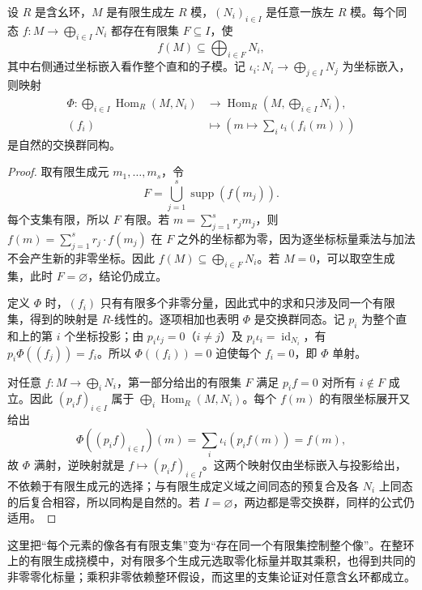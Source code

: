 \begin{proposition}\label{b2:prop:finite-hom-direct-sum}
	设 \(R\) 是含幺环，\(M\) 是有限生成左 \(R\) 模，\((N_i)_{i\in I}\) 是任意一族左 \(R\) 模。每个同态 \(f:M\to\bigoplus_{i\in I}N_i\) 都存在有限集 \(F\subseteq I\)，使
	\[
		f(M)\subseteq\bigoplus_{i\in F}N_i,
	\]
	其中右侧通过坐标嵌入看作整个直和的子模。记 \(\iota_i:N_i\to\bigoplus_{j\in I}N_j\) 为坐标嵌入，则映射
	\[
		\begin{aligned}
			\Phi:\bigoplus_{i\in I}\operatorname{Hom}_R(M,N_i) &\longrightarrow\operatorname{Hom}_R\!\left(M,\bigoplus_{i\in I}N_i\right),\\
			(f_i)&\longmapsto\left(m\longmapsto\sum_i\iota_i(f_i(m))\right)
		\end{aligned}
	\]
	是自然的交换群同构。
\end{proposition}
\begin{proof}
	取有限生成元 \(m_1,\ldots,m_s\)，令
	\[
		F=\bigcup_{j=1}^s\operatorname{supp}(f(m_j)).
	\]
	每个支集有限，所以 \(F\) 有限。若 \(m=\sum_{j=1}^sr_jm_j\)，则 \(f(m)=\sum_{j=1}^sr_j\cdot f(m_j)\) 在 \(F\) 之外的坐标都为零，因为逐坐标标量乘法与加法不会产生新的非零坐标。因此 \(f(M)\subseteq\bigoplus_{i\in F}N_i\)。若 \(M=0\)，可以取空生成集，此时 \(F=\varnothing\)，结论仍成立。

	定义 \(\Phi\) 时，\((f_i)\) 只有有限多个非零分量，因此式中的求和只涉及同一个有限集，得到的映射是 \(R\)-线性的。逐项相加也表明 \(\Phi\) 是交换群同态。记 \(p_i\) 为整个直和上的第 \(i\) 个坐标投影；由 \(p_i\iota_j=0\)（\(i\ne j\)）及 \(p_i\iota_i=\operatorname{id}_{N_i}\)，有 \(p_i\Phi((f_j))=f_i\)。所以 \(\Phi((f_i))=0\) 迫使每个 \(f_i=0\)，即 \(\Phi\) 单射。

	对任意 \(f:M\to\bigoplus_iN_i\)，第一部分给出的有限集 \(F\) 满足 \(p_if=0\) 对所有 \(i\notin F\) 成立。因此 \((p_if)_{i\in I}\) 属于 \(\bigoplus_i\operatorname{Hom}_R(M,N_i)\)。每个 \(f(m)\) 的有限坐标展开又给出
	\[
		\Phi((p_if)_{i\in I})(m)=\sum_i\iota_i(p_if(m))=f(m),
	\]
	故 \(\Phi\) 满射，逆映射就是 \(f\mapsto(p_if)_{i\in I}\)。这两个映射仅由坐标嵌入与投影给出，不依赖于有限生成元的选择；与有限生成定义域之间同态的预复合及各 \(N_i\) 上同态的后复合相容，所以同构是自然的。若 \(I=\varnothing\)，两边都是零交换群，同样的公式仍适用。
\end{proof}

这里把“每个元素的像各有有限支集”变为“存在同一个有限集控制整个像”。在整环上的有限生成挠模中，对有限多个生成元选取零化标量并取其乘积，也得到共同的非零零化标量；乘积非零依赖整环假设，而这里的支集论证对任意含幺环都成立。
